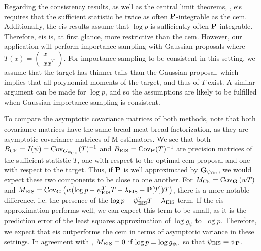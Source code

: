 Regarding the consistency results,  as well as the central limit theorems, , \acrshort{eis} requires that the sufficient statistic be twice as often $\P$-integrable as the \acrshort{cem}. Additionally, the \acrshort{eis} results assume that $\log p$ is sufficiently often $\P$-integrable. Therefore, \acrshort{eis} is, at first glance, more restrictive than the \acrshort{cem}. However, our application will perform importance sampling with Gaussian proposals where $T(x) = \begin{pmatrix} x \\ xx^{T}\end{pmatrix}$. For importance sampling to be consistent in this setting, we assume that the target has thinner tails than the Gaussian proposal, which implies that all polynomial moments of the target, and thus of $T$ exist. A similar argument can be made for $\log p$, and so the assumptions are likely to be fulfilled when Gaussian importance sampling is consistent.

To compare the asymptotic covariance matrices of both methods, note that both covariance matrices have the same \glqq{}bread-meat-bread\grqq{} factorization, as they are asymptotic covariance matrices of M-estimators. We see that both $B_{\ce} = I(\psi) = \cov_{G_{\pce}}(T)^{-1}$ and $B_{\eis} = \cov_{\P}(T)^{-1}$ are precision matrices of the sufficient statistic $T$, one with respect to the optimal \acrshort{cem} proposal and one with respect to the target. Thus, if $\P$ is well approximated by $\G_{\pce}$, we would expect these two components to be close to one another. 
For $M_{\ce} = \cov_{\G} \left( w T \right)$ and $M_{\eis} = \cov_{\G}\left( w (\log p - \psi_{\eis}^{T}T - \lambda_{\eis} - \P [T])T \right)$, there is a more notable difference, i.e. the presence of the $\log p - \psi_{\eis}^TT-\lambda_{\eis}$ term. If the \acrshort{eis} approximation performs well, we can expect this term to be small, as it is the prediction error of the least squares approximation of $\log g_{\psi}$ to $\log p$. Therefore, we expect that \acrshort{eis} outperforms the \acrshort{cem} in terms of asymptotic variance in these settings. In agreement with , $M_{\eis} = 0$ if $\log p = \log g_{\psi_{\P}}$ so that $\peis = \psi_{\P}$.

